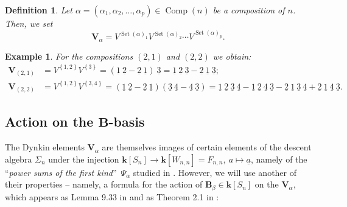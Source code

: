 \documentclass[submission]{FPSAC2026}
\newtheorem{defn}{Definition}
\newtheorem{example}{Example}
\newcommand{\kk}{\mathbf{k}} %
\begin{document}
\begin{defn}
\label{defn.valpha} Let $\alpha=(\alpha_{1},\alpha_2,\dots,\alpha_{p})\in
\operatorname{Comp}(n)$ be a composition of $n$. Then, we set
\[
\mathbf{V}_{\alpha}=V^{\operatorname{Set}(\alpha)_{1}}V^{\operatorname{Set}%
(\alpha)_{2}}\cdots V^{\operatorname{Set}(\alpha)_{p}}.
\]

\end{defn}

\begin{example}
For the compositions $(2,1)$ and $(2,2)$ we obtain:
\begin{align*}
\mathbf{V}_{(2,1)}
&=V^{\left\{  1,2\right\}  }V^{\left\{  3\right\}  }=\left(
\underline{1}\ \underline{2}-\underline{2}\ \underline{1}\right)
\ \underline{3}=\underline{1}\ \underline{2}\ \underline{3}-\underline{2}%
\ \underline{1}\ \underline{3};
\\
\mathbf{V}_{(2,2)}  & =V^{\left\{  1,2\right\}  }V^{\left\{  3,4\right\}
}=\left(  \underline{1}\ \underline{2}-\underline{2}\ \underline{1}\right)
\left(  \underline{3}\ \underline{4}-\underline{4}\ \underline{3}\right)
=\underline{1}\ \underline{2}\ \underline{3}\ \underline{4}-\underline{1}%
\ \underline{2}\ \underline{4}\ \underline{3}-\underline{2}\ \underline{1}%
\ \underline{3}\ \underline{4}+\underline{2}\ \underline{1}\ \underline{4}%
\ \underline{3}.
\end{align*}

\end{example}



\subsection{Action on the $\mathbf{B}$-basis}



The Dynkin elements $\mathbf{V}_{\alpha}$ are themselves images of certain
elements of the descent algebra $\Sigma_{n}$ under the injection
$\kk \left[  S_{n}\right]  \rightarrow \kk \left[  W_{n,n}\right]
= F_{n,n}
,\ a\mapsto\underline{a}$, namely of the \textquotedblleft\emph{power sums of
the first kind}\textquotedblright\ $\Psi_{\alpha}$ studied in \cite[\S 5]%
{NCSF1}. However, we will use another of their properties
-- namely, a formula
for the action of $\mathbf{B}_{\beta}\in \kk \left[  S_{n}\right]  $ on
the $\mathbf{V}_{\alpha}$, which appears as Lemma 9.33 in
\cite{Reutenauer1993} and as Theorem 2.1 in \cite{GarReu89}:
\end{document}
